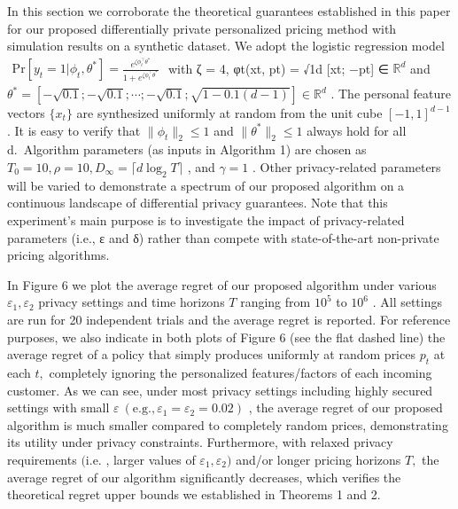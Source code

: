 In this section we corroborate the theoretical guarantees established in this paper for our proposed differentially private personalized pricing method with simulation results on a synthetic dataset. We adopt the logistic regression model \(\begin{array} { r } { \mathrm { P r } [ y _ { t } = 1 | \phi _ { t } , \theta ^ { * } ] = \frac { e ^ { \zeta \phi _ { t } ^ { \top } \theta ^ { * } } } { 1 + e ^ { \zeta \phi _ { t } ^ { \top } \theta ^ { * } } } } \end{array}\) with ζ = 4, φt(xt, pt) = √1d {[}xt; −pt{]} ∈ \(\mathbb { R } ^ { d }\) and \(\theta ^ { * } = [ - \sqrt { 0 . 1 } ; - \sqrt { 0 . 1 } ; \cdots ; - \sqrt { 0 . 1 } ; \sqrt { 1 - 0 . 1 ( d - 1 ) } ] \in \mathbb { R } ^ { d }\) . The personal feature vectors \(\{ x _ { t } \}\) are synthesized uniformly at random from the unit cube \([ - 1 , 1 ] ^ { d - 1 }\) . It is easy to verify that \(\| \phi _ { t } \| _ { 2 } \leq 1\) and \(\| \theta ^ { * } \| _ { 2 } \leq 1\) always hold for all d.~Algorithm parameters (as inputs in Algorithm 1) are chosen as \(T _ { 0 } = 1 0 , \rho = 1 0 , D _ { \infty } = \lceil d \log _ { 2 } T \rceil\) , and \(\gamma = 1\) . Other privacy-related parameters will be varied to demonstrate a spectrum of our proposed algorithm on a continuous landscape of differential privacy guarantees. Note that this experiment's main purpose is to investigate the impact of privacy-related parameters (i.e., ε and δ) rather than compete with state-of-the-art non-private pricing algorithms.

In Figure 6 we plot the average regret of our proposed algorithm under various \(\varepsilon _ { 1 } , \varepsilon _ { 2 }\) privacy settings and time horizons \(T\) ranging from \(1 0 ^ { 5 }\) to \(1 0 ^ { 6 }\) . All settings are run for 20 independent trials and the average regret is reported. For reference purposes, we also indicate in both plots of Figure 6 (see the flat dashed line) the average regret of a policy that simply produces uniformly at random prices \(p _ { t }\) at each \(t ,\) completely ignoring the personalized features/factors of each incoming customer. As we can see, under most privacy settings including highly secured settings with small \(\varepsilon \ ( \mathrm { e . g . } , \varepsilon _ { 1 } = \varepsilon _ { 2 } = 0 . 0 2 )\) , the average regret of our proposed algorithm is much smaller compared to completely random prices, demonstrating its utility under privacy constraints. Furthermore, with relaxed privacy requirements \(( \mathrm { i . e . }\) , larger values of \(\varepsilon _ { 1 } , \varepsilon _ { 2 } )\) and/or longer pricing horizons \(T ,\) the average regret of our algorithm significantly decreases, which verifies the theoretical regret upper bounds we established in Theorems 1 and 2.

